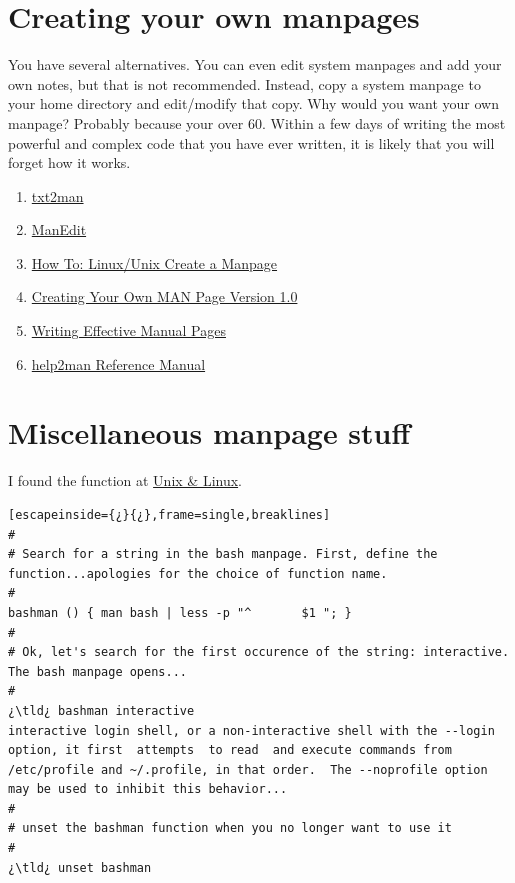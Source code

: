 \section{Creating your own manpages}

You have several alternatives. You can even edit system manpages and add your own notes, but that is not recommended. Instead, copy a system manpage to your home directory and edit/modify that copy. Why would you want your own manpage? Probably because your over 60. Within a few days of writing the most powerful and complex code that you have ever written, it is likely that you will forget how it works. 

\begin{enumerate}
	\item{\href{https://github.com/mvertes/txt2man}{txt2man}}
	\item{\href{http://freecode.com/projects/manedit}{ManEdit}}
	\item{\href{http://www.cyberciti.biz/faq/linux-unix-creating-a-manpage/}{How To: Linux/Unix Create a Manpage}}
	\item{\href{http://www.linuxhowtos.org/System/creatingman.htm}{Creating Your Own MAN Page Version 1.0}}
	\item{\href{http://home.windstream.net/kollar/groff/effman.html}{Writing Effective Manual Pages}}
	\item{\href{http://www.gnu.org/software/help2man/}{help2man Reference Manual}}
\end{enumerate}

\section{Miscellaneous manpage stuff}

I found the  function at \href{http://unix.stackexchange.com/questions/18087/can-i-get-individual-man-pages-for-the-bash-builtin-commands}{Unix \& Linux}.

\begin{lstlisting}[escapeinside={¿}{¿},frame=single,breaklines]
#
# Search for a string in the bash manpage. First, define the function...apologies for the choice of function name.
#
bashman () { man bash | less -p "^       $1 "; }
#
# Ok, let's search for the first occurence of the string: interactive. The bash manpage opens...
#
¿\tld¿ bashman interactive
interactive login shell, or a non-interactive shell with the --login option, it first  attempts  to read  and execute commands from /etc/profile and ~/.profile, in that order.  The --noprofile option may be used to inhibit this behavior...
#
# unset the bashman function when you no longer want to use it
#
¿\tld¿ unset bashman
\end{lstlisting}

